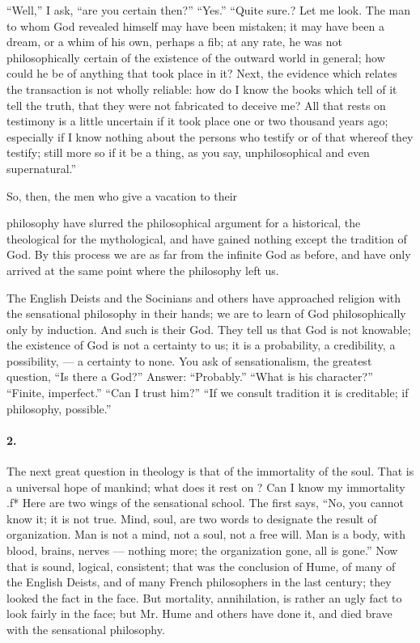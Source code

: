 \documentclass[12pt]{article}
\begin{document}
``Well,'' I ask, ``are you certain then?'' ``Yes.'' 
``Quite sure.? Let me look. The man to whom God 
revealed himself may have been mistaken; it may have 
been a dream, or a whim of his own, perhaps a fib; at 
any rate, he was not philosophically certain of the existence of the outward world in general; how could he 
be of anything that took place in it? Next, the evidence which relates the transaction is not wholly reliable: how do I know the books which tell of it tell the 
truth, that they were not fabricated to deceive me? 
All that rests on testimony is a little uncertain if it took 
place one or two thousand years ago; especially if I 
know nothing about the persons who testify or of that 
whereof they testify; still more so if it be a thing, as 
you say, unphilosophical and even supernatural.'' 

So, then, the men who give a vacation to their 




philosophy have slurred the philosophical argument for 
a historical, the theological for the mythological, and 
have gained nothing except the tradition of God. By 
this process we are as far from the infinite God as before, and have only arrived at the same point where 
the philosophy left us. 

The English Deists and the Socinians and others 
have approached religion with the sensational philosophy in their hands; we are to learn of God philosophically only by induction. And such is their God. They 
tell us that God is not knowable; the existence of God 
is not a certainty to us; it is a probability, a credibility, 
a possibility, --- a certainty to none. You ask of sensationalism, the greatest question, ``Is there a God?'' 
Answer: ``Probably.'' ``What is his character?'' 
``Finite, imperfect.'' ``Can I trust him?'' ``If we 
consult tradition it is creditable; if philosophy, possible.'' 

\paragraph{2.} The next great question in theology is that of the 
immortality of the soul. That is a universal hope of 
mankind; what does it rest on ? Can I know my immortality .f* Here are two wings of the sensational 
school. The first says, ``No, you cannot know it; it is 
not true. Mind, soul, are two words to designate the 
result of organization. Man is not a mind, not a soul, 
not a free will. Man is a body, with blood, brains, 
nerves --- nothing more; the organization gone, all is 
gone.'' Now that is sound, logical, consistent; that 
was the conclusion of Hume, of many of the English 
Deists, and of many French philosophers in the last 
century; they looked the fact in the face. But mortality, annihilation, is rather an ugly fact to look fairly 
in the face; but Mr. Hume and others have done it, 
and died brave with the sensational philosophy. 
\end{document}
